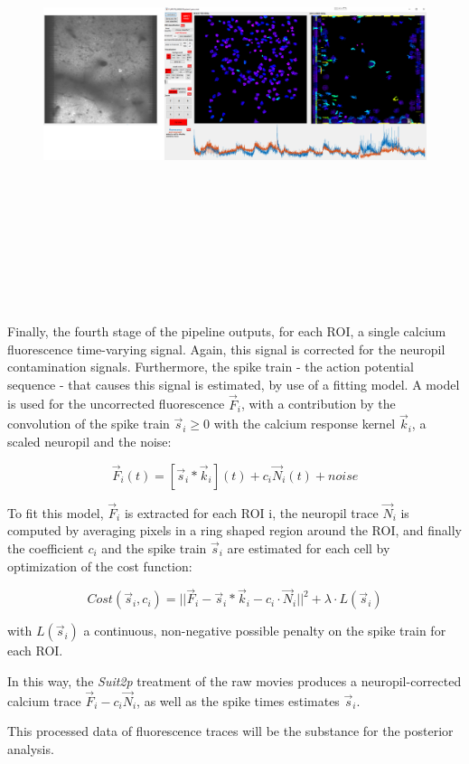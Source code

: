 \begin{figure}[H] \centering \includegraphics[width=13cm,height=13cm,keepaspectratio]{Figures/7.Results/ftraces/suit2p.png} 
\end{figure}

Finally, the fourth stage of the pipeline outputs, for each ROI, a single calcium fluorescence time-varying signal. Again, this signal is corrected for the neuropil contamination signals. Furthermore, the spike train - the action potential sequence - that causes this signal is estimated, by use of a fitting model. 
A model is used for the uncorrected fluorescence $\vec{F}_i$, with a contribution by the convolution of the spike train $\vec{s}_i \geq 0$ with the calcium response kernel $\vec{k}_i$, a scaled neuropil and the noise:

\begin{equation}
    \vec{F}_i(t) = [\vec{s}_i * \vec{k}_i](t) + c_i \vec{N}_i (t) + noise
\end{equation}

To fit this model, $\vec{F}_i$ is extracted for each ROI i, the neuropil trace $\vec{N}_i$ is computed by averaging pixels in a ring shaped region around the ROI, and finally the coefficient $c_i$ and the spike train $\vec{s}_i$ are estimated for each cell by optimization of the cost function:

\begin{equation}
    Cost(\vec{s}_i, c_i)=||\vec{F}_i - \vec{s}_i * \vec{k}_i - c_i \cdot \vec{N}_i|| ^2 + \lambda \cdot L(\vec{s}_i)
\end{equation}

with $L(\vec{s}_i)$ a continuous, non-negative possible penalty on the spike train for each ROI.

In this way, the \textit{Suit2p} treatment of the raw movies produces a neuropil-corrected calcium trace $\vec{F}_i - c_i \vec{N}_i$, as well as the spike times estimates $\vec{s}_i$.

This processed data of fluorescence traces will be the substance for the posterior analysis.